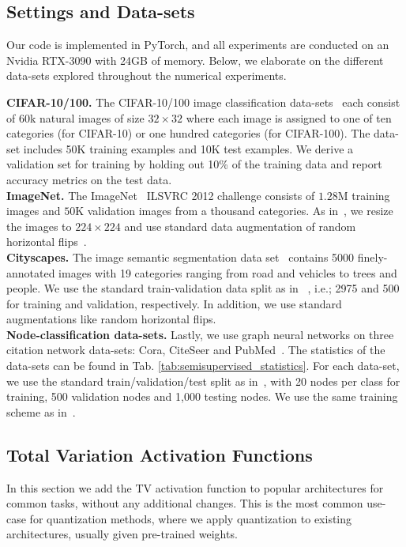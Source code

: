 \documentclass[reqno]{amsart}
\begin{document}
\subsection{\textbf{Settings and Data-sets}}
\label{sub:datasets}
Our code is implemented in PyTorch, and all experiments are conducted on an Nvidia RTX-3090 with 24GB of memory. Below, we elaborate on the different data-sets explored throughout the numerical experiments.

\noindent\textbf{CIFAR-10/100.}
The CIFAR-10/100 image classification data-sets~\cite{krizhevsky2009learning} each consist of 60k natural images of size $32\times32$ where each image is assigned to one of ten categories (for CIFAR-10) or one hundred categories (for CIFAR-100). The data-set includes 50K training examples and 10K test examples. We derive a validation set for training by holding out 10\% of the training data and report accuracy metrics on the test data.
\\
\noindent\textbf{ImageNet.}
The ImageNet~\cite{ImageNet} ILSVRC 2012 challenge consists of $1.28$M training images and $50$K validation images from a thousand categories. As in~\cite{he2016deep},  we resize the images to $224\times 224$ and use standard data augmentation of random horizontal flips~\cite{he2016deep}.
\\
\noindent\textbf{Cityscapes.}  The image semantic segmentation data set~\cite{cordts2016cityscapes} contains 5000 finely-annotated images with 19 categories ranging from road and vehicles to trees and people. We use the standard train-validation data split as in~\cite{cordts2016cityscapes} , i.e.; 2975 and 500 for training and validation, respectively.
In addition, we use standard augmentations like random horizontal flips.
\\
\noindent\textbf{Node-classification data-sets.}
Lastly, we use graph neural networks on three citation network data-sets: Cora, CiteSeer and PubMed~\cite{sen2008collective}. The statistics of the data-sets can be found in Tab. \ref{tab:semisupervised_statistics}. For each data-set, we use the standard train/validation/test split as in~\cite{yang2016revisiting}, with 20 nodes per class for training, 500 validation nodes and 1,000 testing nodes. We use the same training scheme as in~\cite{chen2020simple}. 

\subsection{\textbf{Total Variation Activation Functions}}
\label{sub:experiment_tv}
In this section we add the TV activation function to popular architectures for common tasks, without any additional changes. This is the most common use-case for quantization methods, where we apply quantization to existing architectures, usually given pre-trained weights. 
\end{document}
